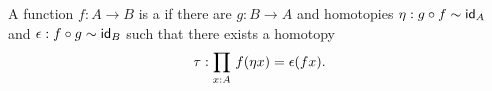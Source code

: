 \documentclass[hott-all.tex]{subfiles}
\begin{document}
\begin{defn}\label{defn:ishae}
  A function $f:A\to B$ is a 
  if there are $g:B\to A$ and homotopies $\eta: g \circ f \htpy \idfunc[A]$ and $\epsilon:f \circ g \htpy \idfunc[B]$ such that there exists a homotopy
  \[\tau : \prd{x:A} \map{f}{\eta x} = \epsilon(fx).\]
\end{defn}
%
%
\end{document}

